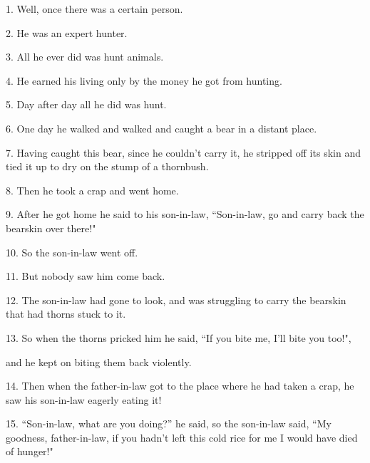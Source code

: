 \setcounter{footnote}{0}

1. Well, once there was a certain person.

2. He was an expert hunter.

3. All he ever did was hunt animals.

4. He earned his living only by the money he got from hunting.

5. Day after day all he did was hunt.

6. One day he walked and walked and caught a bear in a distant place.

7. Having caught this bear, since he couldn't carry it, he stripped off its skin
and tied it up to dry on the stump of a thornbush.

8. Then he took a crap and went home.

9. After he got home he said to his son-in-law, ``Son-in-law, go and carry
back the bearskin over there!"

10. So the son-in-law went off.

11. But nobody saw him come back.

12. The son-in-law had gone to look, and was struggling to carry the bearskin that
had thorns stuck to it.

13. So when the thorns pricked him he said, ``If you bite me, I'll bite
you too!",

and he kept on biting them back violently.

14. Then when the father-in-law got to the place where he had taken a crap, he saw
his son-in-law eagerly eating it!

15. ``Son-in-law, what are you doing?'' he said, so the son-in-law
said, ``My goodness, father-in-law, if you hadn't left this cold rice for
me I would have died of hunger!"

